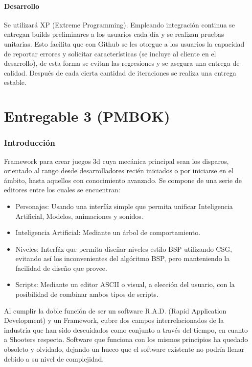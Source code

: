 \documentclass[]{article}
\begin{document}
\subsection{Desarrollo}

Se utilizar\'a XP (Extreme Programming). Empleando integraci\'on continua se entregan builds preliminares a los usuarios cada d\'ia y se realizan pruebas unitarias. Esto facilita que con Github se les otorgue a los usuarios la capacidad de reportar errores y solicitar caracter\'isticas (se incluye al cliente en el desarrollo), de esta forma se evitan las regresiones y se asegura una entrega de calidad. Despu\'es de cada cierta cantidad de iteraciones se realiza una entrega estable. 
\part{Entregable 3 (PMBOK)}
\section{Introducci\'on}
Framework para crear juegos 3d cuya mec\'anica principal sean los disparos, orientado al rango desde desarrolladores reci\'en iniciados o por iniciarse en el \'ambito, hasta aquellos con conocimiento avanzado. Se compone de una serie de editores entre los cuales se encuentran:
\begin{itemize}
	\item Personajes: Usando una interf\'az simple que permita unificar Inteligencia Artificial, Modelos, animaciones y sonidos. 
	\item Inteligencia Artificial: Mediante un \'arbol de comportamiento.
	\item Niveles: Interf\'az que permita dise\~nar niveles estilo BSP utilizando CSG, evitando as\'i los inconvenientes del alg\'oritmo BSP, pero manteniendo la facilidad de dise\~no que provee. 
	\item Scripts: Mediante un editor ASCII o visual, a elecci\'on del usuario, con la posibilidad de combinar ambos tipos de scripts. 
\end{itemize}	
Al cumplir la doble funci\'on de ser un software R.A.D. (Rapid Application Development) y un Framework, cubre dos campos interrelacionados de la industria que han sido descuidados como conjunto a trav\'es del tiempo, en cuanto a Shooters respecta. 
Software que funciona con los mismos principios ha quedado obsoleto y olvidado, dejando un hueco que el software existente no podr\'ia llenar debido a su nivel de complejidad.
\end{document}
